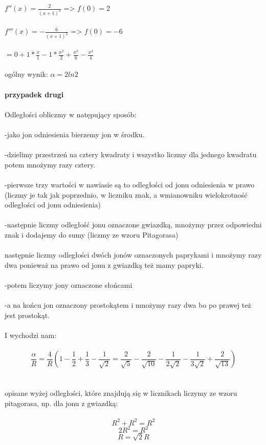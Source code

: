 $f''(x)=\frac{2}{(x+1)^3}$   =>   $f(0)=2$
\\
\\
$f'''(x)=-\frac{6}{(x+1)^5}$   =>   $f(0)=-6$
\\
\\
$=0+1*\frac{x}{1}-1*\frac{x^2}{2}+\frac{x^3}{6}-\frac{x^4}{4}$
\\
\\
ogólny wynik:
$\alpha=2ln2$
\\
\\
\textbf{przypadek drugi}
\\
\\
Odległości obliczmy w natępujący sposób:
\\
\\
-jako jon odniesienia bierzemy jon w środku.
\\
\\
-dzielimy przestrzeń na cztery kwadraty i wszystko liczmy dla jednego kwadratu potem mnożymy razy cztery.
\\
\\
-pierwsze trzy wartości w nawiasie są to odległości od jonu odniesienia w prawo (liczmy je tak jak poprzednio, w liczniku znak, a wmianowniku wielokrotność odległości od jonu odniesienia)
\\
\\
-następnie liczmy odległość jonu oznaczone gwiazdką, mnożymy przez odpowiedni znak i dodajemy do sumy (liczmy ze wzoru Pitagorasa)
\\
\\
następnie liczmy odległości dwóch jonów oznaczonych paprykami i mnożymy razy dwa ponieważ na prawo od jonu z gwiazdką też mamy papryki.
\\
\\
-potem liczymy jony oznaczone słońcami 
\\
\\
-a na końcu jon oznaczony prostokątem i mnożymy razy dwa bo po prawej też jest prostokąt.
\\
\\
I wychodzi nam:
\\
\\
\begin{equation}
\frac{\alpha}{R} =\frac{4}{R}(1-\frac{1}{2}+\frac{1}{3}-\frac{1}{\sqrt{2}}=\frac{2}{\sqrt{5}}-\frac{2}{\sqrt{10}}-\frac{1}{2\sqrt{2}}-\frac{1}{3\sqrt{2}}+\frac{2}{\sqrt{13}})
\end{equation}
\\
\\
opisane wyżej odległości, które znajdują się w licznikach liczymy ze wzoru pitagorasa, np. dla jonu z gwiazdką:
\\
\\
\begin{equation}
R^2+R^2=R^2
\end{equation}
\begin{equation}
2R^2=R^2
\end{equation}
\begin{equation}
R=\sqrt{2}R
\end{equation}
